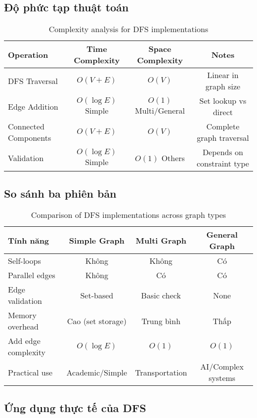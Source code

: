 \documentclass[12pt]{article}
\begin{document}
\subsection*{Độ phức tạp thuật toán}

\begin{table}[H]
\centering
\footnotesize
\begin{tabular}{|l|c|c|c|}
\hline
\textbf{Operation} & \textbf{Time Complexity} & \textbf{Space Complexity} & \textbf{Notes} \\
\hline
DFS Traversal & $O(V + E)$ & $O(V)$ & Linear in graph size \\
Edge Addition & $O(\log E)$ Simple & $O(1)$ Multi/General & Set lookup vs direct \\
Connected Components & $O(V + E)$ & $O(V)$ & Complete graph traversal \\
Validation & $O(\log E)$ Simple & $O(1)$ Others & Depends on constraint type \\
\hline
\end{tabular}
\caption{Complexity analysis for DFS implementations}
\end{table}

\subsection*{So sánh ba phiên bản}

\begin{table}[H]
\centering
\footnotesize
\begin{tabular}{|l|c|c|c|}
\hline
\textbf{Tính năng} & \textbf{Simple Graph} & \textbf{Multi Graph} & \textbf{General Graph} \\
\hline
Self-loops & Không & Không & Có \\
Parallel edges & Không & Có & Có \\
Edge validation & Set-based & Basic check & None \\
Memory overhead & Cao (set storage) & Trung bình & Thấp \\
Add edge complexity & $O(\log E)$ & $O(1)$ & $O(1)$ \\
Practical use & Academic/Simple & Transportation & AI/Complex systems \\
\hline
\end{tabular}
\caption{Comparison of DFS implementations across graph types}
\end{table}

\subsection*{Ứng dụng thực tế của DFS}
\end{document}
